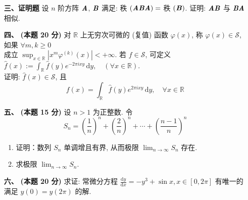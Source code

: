 \documentclass[UTF8]{ctexart}
\begin{document}
\begin{enumerate}[labelsep=-0.2em,leftmargin=2em,align=left]
\item[{ \textbf{三、证明题}}]  设 $n$ 阶方阵 $\text{\textbf{\textit{A}}}$, $\text{\textbf{\textit{B}}}$ 满足:  秩 $(\text{\textbf{\textit{ABA}}})=$ 秩 $(\text{\textbf{\textit{B}}})$. 证明:  $\text{\textbf{\textit{AB}}}$ 与 $\text{\textbf{\textit{BA}}}$ 相似.
\item[{ \textbf{四、}}] {\textbf{(本题 20 分)}} 对 $\mathbb{R}$ 上无穷次可微的 (复值) 函数 $\varphi(x)$, 称 $\varphi(x)\in\mathscr{S}$, 如果 $\forall m,k\geqslant0$ \\[1mm]
		成立 $\sup_{x\in\mathbb{R}}\left|x^m\varphi^{(k)}(x)\right|<+\infty$. 若 $f\in\mathscr{S}$, 可定义 $\hat{f}(x):=\int_{\mathbb{R}}\hat{f}(y)e^{-2\pi ixy}\,\mathrm{d}y,\quad (\forall x\in\mathbb{R}).$ \\[1mm]
		证明: $\hat{f}(x)\in\mathscr{S}$, 且 \[f(x)=\int_{\mathbb{R}}\hat{f}(y)e^{2\pi ixy}\,\mathrm{d}y,\quad \forall x\in\mathbb{R}\]
\item[{\textbf{五、}}] {\textbf{(本题 15 分)}} 设 $n>1$ 为正整数. 令 \[S_n=\left(\frac{1}{n}\right)^n+\left(\frac{2}{n}\right)^n+\cdots+\left(\frac{n-1}{n}\right)^n\]
		\begin{enumerate}[label={\arabic*.},labelsep=-1.7em,leftmargin=1.0em,align=left]
			\item 证明：数列 $S_n$ 单调增且有界, 从而极限 $\lim_{n\to\infty}S_n$ 存在.
			\item 求极限 $\lim_{n\to\infty}S_n$.
		\end{enumerate}
\item[{\textbf{ 六、}}] {\textbf{(本题 20 分)}} 求证: 常微分方程 $\frac{\mathrm{d}y}{\mathrm{d}x}=-y^3+\sin x,x\in[0,2\pi]$  有唯一的满足 $y(0)=y(2\pi)$ 的解.
	\end{enumerate}
	
	
\end{document}
